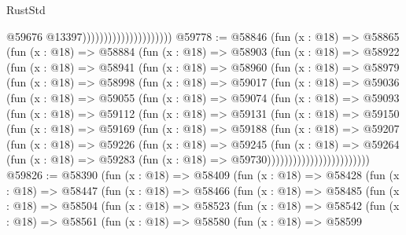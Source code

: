 \begin{lexlean}{RustStd}
\begin{coremodule}
                                              @59676
                                              @13397)))))))))))))))))))))
@59778 := @58846
    (fun (x : @18) =>
    @58865
      (fun (x : @18) =>
      @58884
        (fun (x : @18) =>
        @58903
          (fun (x : @18) =>
          @58922
            (fun (x : @18) =>
            @58941
              (fun (x : @18) =>
              @58960
                (fun (x : @18) =>
                @58979
                  (fun (x : @18) =>
                  @58998
                    (fun (x : @18) =>
                    @59017
                      (fun (x : @18) =>
                      @59036
                        (fun (x : @18) =>
                        @59055
                          (fun (x : @18) =>
                          @59074
                            (fun (x : @18) =>
                            @59093
                              (fun (x : @18) =>
                              @59112
                                (fun (x : @18) =>
                                @59131
                                  (fun (x : @18) =>
                                  @59150
                                    (fun (x : @18) =>
                                    @59169
                                      (fun (x : @18) =>
                                      @59188
                                        (fun (x : @18) =>
                                        @59207
                                          (fun (x : @18) =>
                                          @59226
                                            (fun (x : @18) =>
                                            @59245
                                              (fun (x : @18) =>
                                              @59264
                                                (fun (x : @18) =>
                                                @59283
                                                  (fun (x : @18) => @59730))))))))))))))))))))))))
@59826 := @58390
    (fun (x : @18) =>
    @58409
      (fun (x : @18) =>
      @58428
        (fun (x : @18) =>
        @58447
          (fun (x : @18) =>
          @58466
            (fun (x : @18) =>
            @58485
              (fun (x : @18) =>
              @58504
                (fun (x : @18) =>
                @58523
                  (fun (x : @18) =>
                  @58542
                    (fun (x : @18) =>
                    @58561
                      (fun (x : @18) =>
                      @58580
                        (fun (x : @18) =>
                        @58599

\end{coremodule}
\end{lexlean}
